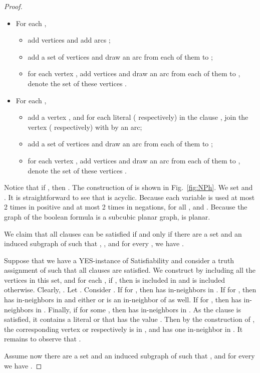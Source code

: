 \documentclass[11pt,a4paper]{article}
\begin{document}
\begin{proof}
\begin{itemize}
\item For each ,
\begin{itemize}
\item add vertices  and add arcs ;
\item add a set of  vertices  and draw an arc from each of them to ;
\item for each vertex , add  vertices and draw an arc from each of them to , denote the set of these
     vertices .
\end{itemize}
\item For each ,
\begin{itemize}
\item add a vertex , and for each literal  ( respectively) in the clause , join the
    vertex  ( respectively) with  by an arc;
\item add a set of  vertices  and draw an arc from each of them to ;
\item for each vertex , add  vertices and draw an arc from each of them to , denote the set of these
     vertices .
\end{itemize}
\end{itemize}
Notice that if , then . The construction of  is shown in Fig.~\ref{fig:NPh}. We set
 and . It is straightforward to see that  is acyclic. Because
each variable  is used at most 2 times in positive and at most 2 times in negations,  for all , and . 
Because the graph of the boolean formula is a subcubic planar graph,  
 is planar.

We claim that all clauses  can be satisfied if and only if there are a set 
and an induced subgraph  of  such
that , , and for every , we have .

Suppose that we have a YES-instance of {\sc Satisfiability} and consider a truth assignment of  such that
all clauses are satisfied. We construct  by including all the vertices  in
this set, and for each , if , then  is included in  and  is
included otherwise. Clearly, . Let . Consider . If
 for , then  has  in-neighbors in . If  for ,
then  has  in-neighbors in  and either  or  is an in-neighbor of  as well. If 
for , then  has  in-neighbors in . Finally, if  for some
, then  has  in-neighbors in . As the clause  is satisfied, it contains a literal 
or  that has the value . Then by the construction of , the corresponding vertex  or
 respectively is in , and  has one in-neighbor in . It remains to observe that
.

Assume now there are a set 
and an induced subgraph  of  such
that ,  and for every  we have .


\end{proof}
\end{document}
